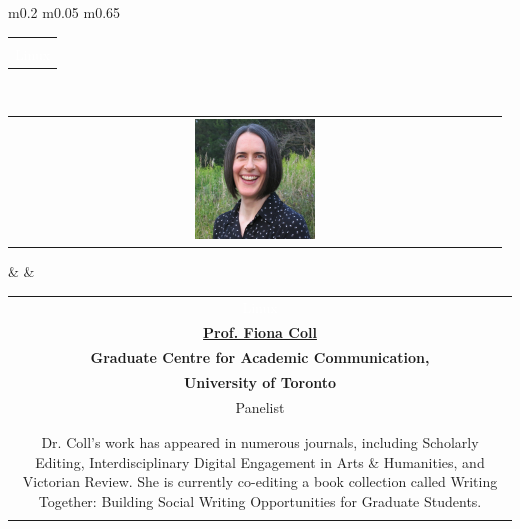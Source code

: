 \documentclass[titlepage,oneside,openany,10pt]{book}
\begin{document}
\begin{tabular}{  m{0.2\textwidth}  m{0.05\textwidth}  m{0.65\textwidth}  }
\begin{tabular}[c]{@{}c@{}}
\begin{tabularx}{\linewidth}{@{}XXX@{}}
\qquad To better communicate with lay audiences, Dr. Bear has recently attended the Munk School of Global Journalism, and she has written articles for major media outlets such as CBC, Canadian Press, and The Toronto Star. She is currently collaborating with pharmaceutical companies to expedite the translation of laboratory-based findings into clinically relevant interventions.\\
\textcolor{white}{Linux}
\end{tabularx}
\end{tabular}\\
\midrule
\begin{tabular}[c]{@{}c@{}} 
\includegraphics[width=0.25\textwidth]{Other_Figures/FColl.png} 
\end{tabular}		& 		
& \begin{tabular}[c]{@{}c@{}}
\textcolor{white}{Linux}\\
\textbf{\underline{Prof. Fiona Coll}}\\
\textbf{Graduate Centre for Academic Communication,}\\ \textbf{University of Toronto}\\
Panelist\\\\
\begin{tabularx}{\linewidth}{@{}XXX@{}}
Dr. Fiona Coll is an Assistant Professor, Teaching Stream at the Graduate Centre for Academic Communication, and Institute for Studies in Transdisciplinary Engineering Education \& Practice. Her research interests include nineteenth-century conceptions of the relationship between technology and creativity, the efficacy of collaborative writing processes in the classroom, and the role that effect plays in teaching and learning experiences.\\
\qquad Dr. Coll’s work has appeared in numerous journals, including Scholarly Editing, Interdisciplinary Digital Engagement in Arts \& Humanities, and Victorian Review. She is currently co-editing a book collection called Writing Together: Building Social Writing Opportunities for Graduate Students.\\

\end{tabularx}
\end{tabular}
\end{tabular}
\end{document}
